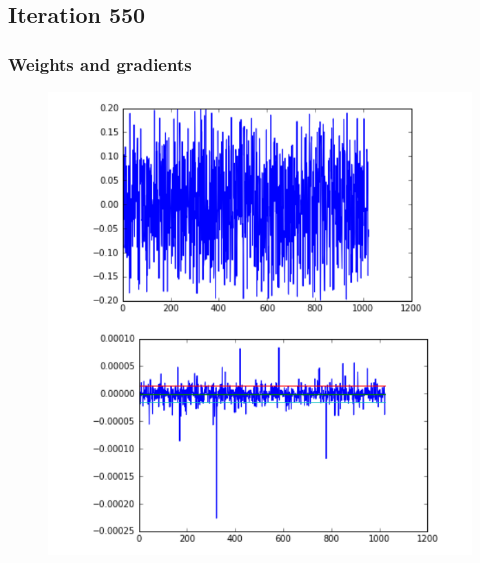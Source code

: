 \subsection{Iteration 550}
\begin{frame}
    \frametitle{Weights and gradients}
    \begin{figure}
		\includegraphics[scale=0.3]{figure/551-1.PNG}
    \end{figure}
\end{frame}
